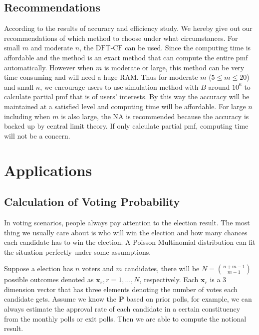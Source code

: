 \documentclass[12pt]{article}
\newcommand{\Pmat}{\mathbf{P}}
\newcommand{\xvec}{\boldsymbol{x}}
\newcommand{\NA}{{\textrm{NA}}}
\newcommand{\dft}{{\textrm{DFT-CF}}}
\begin{document}
\subsection{Recommendations}
According to the results of accuracy and efficiency study. We hereby give out our recommendations of which method to choose under what circumstances. For small $m$ and moderate $n$, the $\dft$ can be used. Since the computing time is affordable and the method is an exact method that can compute the entire pmf automatically. However when $m$ is moderate or large, this method can be very time consuming and will need a huge RAM. Thus for moderate $m$ ($5 \leq m \leq 20$) and small $n$, we encourage users to use simulation method with $B$ around $10^6$ to calculate partial pmf that is of users' interests. By this way the accuracy will be maintained at a satisfied level and computing time will be affordable. For large $n$ including when $m$ is also large, the $\NA$ is recommended because the accuracy is backed up by central limit theory. If only calculate partial pmf, computing time will not be a concern.

\section{Applications}\label{sec:applications}
\subsection{Calculation of Voting Probability}
In voting scenarios, people always pay attention to the election result. The most thing we usually care about is who will win the election and how many chances each candidate has to win the election. A Poisson Multinomial distribution can fit the situation perfectly under some assumptions.

Suppose a election has $n$ voters and $m$ candidates, there will be $N = \binom{n+m-1}{m-1}$ possible outcomes denoted as $\xvec_r, r = 1, \dots, N$, respectively. Each $\xvec_r$ is a 3 dimension vector that has three elements denoting the number of votes each candidate gets. Assume we know the $\Pmat$ based on prior polls, for example, we can always estimate the approval rate of each candidate in a certain constituency from the monthly polls or exit polls. Then we are able to compute the notional result.
\end{document}
